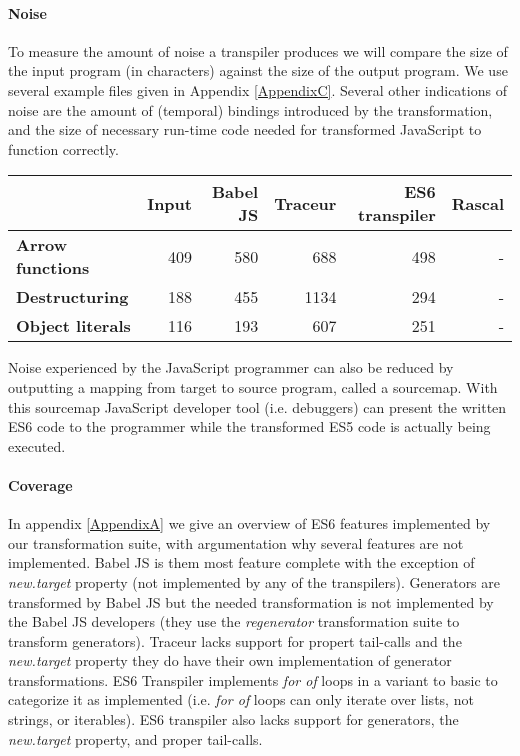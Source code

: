 \paragraph{Noise}
To measure the amount of noise a transpiler produces we will compare the size of the input program (in characters) against the size of the output program. We use several example files given in Appendix \ref{AppendixC}. Several other indications of noise are the amount of (temporal) bindings introduced by the transformation, and the size of necessary run-time code needed for transformed JavaScript to function correctly.

\begin{table}
\begin{tabular}{@{}lrrrrr@{}}
\toprule
{}                         & \textbf{Input} & \textbf{Babel JS} & \textbf{Traceur} & \textbf{ES6 transpiler} & \textbf{Rascal} \\ \midrule
\textbf{Arrow functions}   & 409            & 580               & 688              & 498 & - \\
\textbf{Destructuring}     & 188            & 455               & 1134             & 294 & - \\ 
\textbf{Object literals}   & 116            & 193               & 607              & 251 & - \\    
\bottomrule
\end{tabular}
\end{table}

Noise experienced by the JavaScript programmer can also be reduced by outputting a mapping from target to source program, called a sourcemap. With this sourcemap JavaScript developer tool (i.e. debuggers) can present the written ES6 code to the programmer while the transformed ES5 code is actually being executed.

\paragraph{Coverage}
In appendix \ref{AppendixA} we give an overview of ES6 features implemented by our transformation suite, with argumentation why several features are not implemented. Babel JS is them most feature complete with the exception of \textit{new.target} property (not implemented by any of the transpilers). Generators are transformed by Babel JS but the needed transformation is not implemented by the Babel JS developers (they use the \textit{regenerator} transformation suite to transform generators). Traceur lacks support for propert tail-calls and the \textit{new.target} property they do have their own implementation of generator transformations. ES6 Transpiler implements \textit{for of} loops in a variant to basic to categorize it as implemented (i.e. \textit{for of} loops can only iterate over lists, not strings, or iterables). ES6 transpiler also lacks support for generators, the \textit{new.target} property, and proper tail-calls.

